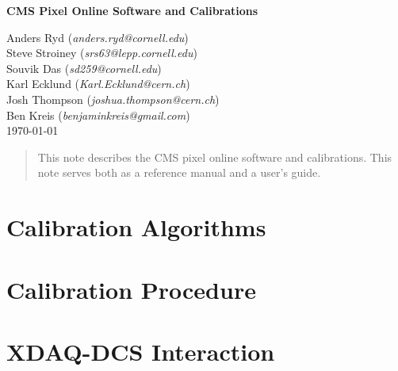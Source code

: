 \documentclass[12pt]{article}
\begin{document}

\begin{center}
{\Large{\bf CMS Pixel Online Software and Calibrations}}
\end{center}
\begin{center}
\vskip 0.5cm
Anders Ryd ({\it anders.ryd@cornell.edu})\\
Steve Stroiney ({\it srs63@lepp.cornell.edu})\\
Souvik Das ({\it sd259@cornell.edu}) \\
Karl Ecklund ({\it Karl.Ecklund@cern.ch})\\
Josh Thompson ({\it joshua.thompson@cern.ch}) \\
Ben Kreis ({\it benjaminkreis@gmail.com})\\
\today \\
\end{center}


\begin{abstract}
This note describes the CMS pixel online software and
calibrations. This note serves both as a reference manual
and a user's guide. 

\end{abstract}

\newpage

\tableofcontents

\newpage



\section{Calibration Algorithms}
\label{sect:calib}


\section{Calibration Procedure}
\label{sec:calibproc}


\section{XDAQ-DCS Interaction}
\label{sec:dcs}

\end{document}
